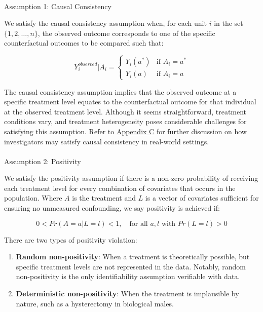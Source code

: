 \documentclass[
  single column]{article}
\makeatletter
\let\oldparagraph\paragraph
\renewcommand{\paragraph}{
    \@ifstar
      \xxxParagraphStar
      \xxxParagraphNoStar
  }
\newcommand{\xxxParagraphStar}[1]{\oldparagraph*{#1}\mbox{}}
\newcommand{\xxxParagraphNoStar}[1]{\oldparagraph{#1}\mbox{}}
\providecommand{\tightlist}{%
  \setlength{\itemsep}{0pt}\setlength{\parskip}{0pt}}\usepackage{longtable,booktabs,array}
\makeatother
\begin{document}
\paragraph{Assumption 1: Causal
Consistency}\label{assumption-1-causal-consistency}

We satisfy the causal consistency assumption when, for each unit \(i\)
in the set \(\{1, 2, \ldots, n\}\), the observed outcome corresponds to
one of the specific counterfactual outcomes to be compared such that:

\[
Y_i^{observed}|A_i = 
\begin{cases} 
Y_i(a^*) & \text{if } A_i = a^* \\
Y_i(a) & \text{if } A_i = a
\end{cases}
\]

The causal consistency assumption implies that the observed outcome at a
specific treatment level equates to the counterfactual outcome for that
individual at the observed treatment level. Although it seems
straightforward, treatment conditions vary, and treatment heterogeneity
poses considerable challenges for satisfying this assumption. Refer to
\hyperref[id-app-c]{Appendix C} for further discussion on how
investigators may satisfy causal consistency in real-world settings.

\paragraph{Assumption 2: Positivity}\label{assumption-2-positivity}

We satisfy the positivity assumption if there is a non-zero probability
of receiving each treatment level for every combination of covariates
that occurs in the population. Where \(A\) is the treatment and \(L\) is
a vector of covariates sufficient for ensuring no unmeasured
confounding, we say positivity is achieved if:

\[
0 < Pr(A = a | L = l) < 1, \quad \text{for all } a, l \text{ with } Pr(L = l) > 0
\]

There are two types of positivity violation:

\begin{enumerate}
\def\labelenumi{\arabic{enumi}.}
\tightlist
\item
  \textbf{Random non-positivity}: When a treatment is theoretically
  possible, but specific treatment levels are not represented in the
  data. Notably, random non-positivity is the only identifiability
  assumption verifiable with data.
\item
  \textbf{Deterministic non-positivity}: When the treatment is
  implausible by nature, such as a hysterectomy in biological males.
\end{enumerate}
\end{document}
